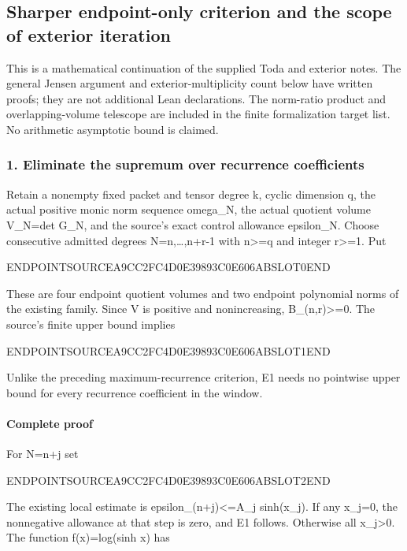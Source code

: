\subsection{Sharper endpoint-only criterion and the scope of exterior iteration}\label{endpoint-pr23_corrected--sharper-endpoint-only-criterion-and-the-scope-of-exterior-iteration}

This is a mathematical continuation of the supplied Toda and exterior notes. The general Jensen argument and exterior-multiplicity count below have written proofs; they are not additional Lean declarations. The norm-ratio product and overlapping-volume telescope are included in the finite formalization target list. No arithmetic asymptotic bound is claimed.

\subsubsection{1. Eliminate the supremum over recurrence coefficients}\label{endpoint-pr23_corrected--eliminate-the-supremum-over-recurrence-coefficients}

Retain a nonempty fixed packet and tensor degree k, cyclic dimension q, the actual positive monic norm sequence omega\_N, the actual quotient volume V\_N=det G\_N, and the source's exact control allowance epsilon\_N. Choose consecutive admitted degrees N=n,\ldots,n+r-1 with n\textgreater=q and integer r\textgreater=1. Put

ENDPOINTSOURCEA9CC2FC4D0E39893C0E606ABSLOT0END

These are four endpoint quotient volumes and two endpoint polynomial norms of the existing family. Since V is positive and nonincreasing, B\_(n,r)\textgreater=0. The source's finite upper bound implies

ENDPOINTSOURCEA9CC2FC4D0E39893C0E606ABSLOT1END

Unlike the preceding maximum-recurrence criterion, E1 needs no pointwise upper bound for every recurrence coefficient in the window.

\paragraph{Complete proof}\label{endpoint-pr23_corrected--complete-proof}

For N=n+j set

ENDPOINTSOURCEA9CC2FC4D0E39893C0E606ABSLOT2END

The existing local estimate is epsilon\_(n+j)\textless=A\_j sinh(x\_j). If any x\_j=0, the nonnegative allowance at that step is zero, and E1 follows. Otherwise all x\_j\textgreater0. The function f(x)=log(sinh x) has

